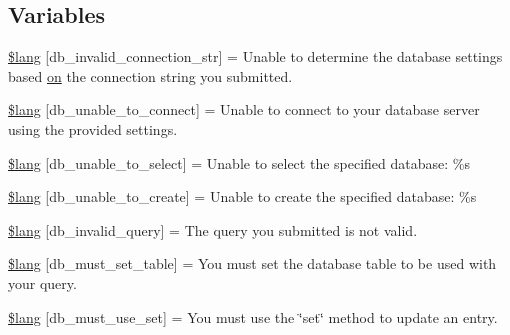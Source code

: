 \subsection*{Variables}
\begin{DoxyCompactItemize}
\item 
\hyperlink{system_2language_2english_2db__lang_8php_a0c2ed2613101d37cbaba14042530c16d}{\$lang} \mbox{[}\textquotesingle{}db\+\_\+invalid\+\_\+connection\+\_\+str\textquotesingle{}\mbox{]} = \textquotesingle{}Unable to determine the database settings based \hyperlink{how_to_play_8js_af1f111425a03a603c02a2abf44ad8c43}{on} the connection string you submitted.\textquotesingle{}
\item 
\hyperlink{system_2language_2english_2db__lang_8php_aa5935b86c957eb15ac7d41cf84143d66}{\$lang} \mbox{[}\textquotesingle{}db\+\_\+unable\+\_\+to\+\_\+connect\textquotesingle{}\mbox{]} = \textquotesingle{}Unable to connect to your database server using the provided settings.\textquotesingle{}
\item 
\hyperlink{system_2language_2english_2db__lang_8php_a3c93974df838c0e036690874108715ea}{\$lang} \mbox{[}\textquotesingle{}db\+\_\+unable\+\_\+to\+\_\+select\textquotesingle{}\mbox{]} = \textquotesingle{}Unable to select the specified database\+: \%s\textquotesingle{}
\item 
\hyperlink{system_2language_2english_2db__lang_8php_a4266e3b235feb16d9cf2e88afd1fedac}{\$lang} \mbox{[}\textquotesingle{}db\+\_\+unable\+\_\+to\+\_\+create\textquotesingle{}\mbox{]} = \textquotesingle{}Unable to create the specified database\+: \%s\textquotesingle{}
\item 
\hyperlink{system_2language_2english_2db__lang_8php_a2cbf4ee929f45a29a0dcf21280bad485}{\$lang} \mbox{[}\textquotesingle{}db\+\_\+invalid\+\_\+query\textquotesingle{}\mbox{]} = \textquotesingle{}The query you submitted is not valid.\textquotesingle{}
\item 
\hyperlink{system_2language_2english_2db__lang_8php_a0f5d469f071f2b5327b44761f4a06396}{\$lang} \mbox{[}\textquotesingle{}db\+\_\+must\+\_\+set\+\_\+table\textquotesingle{}\mbox{]} = \textquotesingle{}You must set the database table to be used with your query.\textquotesingle{}
\item 
\hyperlink{system_2language_2english_2db__lang_8php_a55e22fb14cedc8ee7f70980bf7f37308}{\$lang} \mbox{[}\textquotesingle{}db\+\_\+must\+\_\+use\+\_\+set\textquotesingle{}\mbox{]} = \textquotesingle{}You must use the \char`\"{}set\char`\"{} method to update an entry.\textquotesingle{}
\item 

\end{DoxyCompactItemize}
